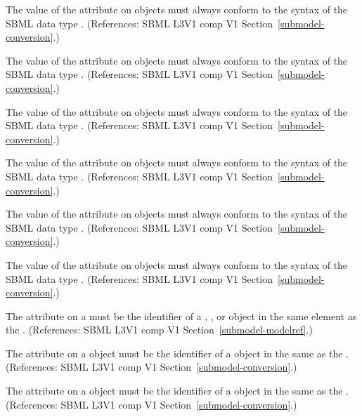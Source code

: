 \begin{sbmlenum}
 { The value of the  attribute 
  on \Submodel objects must always conform to the syntax of
  the SBML data type .
  (References: SBML L3V1 comp V1 Section~\ref{submodel-conversion}.) }


 { The value of the  attribute 
  on \Submodel objects must always conform to the syntax of
  the SBML data type .
  (References: SBML L3V1 comp V1 Section~\ref{submodel-conversion}.) }


 { The value of the  attribute 
  on \Submodel objects must always conform to the syntax of
  the SBML data type .
  (References: SBML L3V1 comp V1 Section~\ref{submodel-conversion}.) }


 { The value of the  attribute 
  on \Submodel objects must always conform to the syntax of
  the SBML data type .
  (References: SBML L3V1 comp V1 Section~\ref{submodel-conversion}.) }


 { The value of the  attribute 
  on \Submodel objects must always conform to the syntax of
  the SBML data type .
  (References: SBML L3V1 comp V1 Section~\ref{submodel-conversion}.) }


 { The value of the  attribute 
  on \Submodel objects must always conform to the syntax of
  the SBML data type .
  (References: SBML L3V1 comp V1 Section~\ref{submodel-conversion}.) }


 { The  attribute on a \Submodel must
  be the identifier of a \Model, \ModelDefinition, or
  \ExternalModelDefinition object in the same  element as the
  \Submodel. 
  (References: SBML L3V1 comp V1 Section~\ref{submodel-modelref}.) }


 { The  attribute
   on a \Submodel object must be the identifier of a \Parameter object in the 
   same \Model as the \Submodel.
  (References: SBML L3V1 comp V1 Section~\ref{submodel-conversion}.) }


 { The  attribute
   on a \Submodel object must be the identifier of a \Parameter object in the 
   same \Model as the \Submodel.
  (References: SBML L3V1 comp V1 Section~\ref{submodel-conversion}.) }



\end{sbmlenum}
